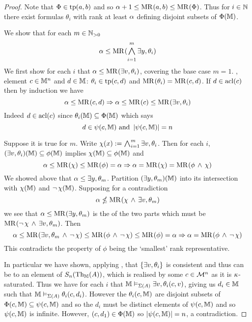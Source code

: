 \begin{proof}
    Note that $\Phi \in \operatorname{tp}(a,b)$ and so 
    $\alpha + 1 \leq \mathrm{MR}^{}(a,b) \leq \mathrm{MR}^{}(\Phi)$.
    Thus for $i \in \mathbb{N}$ there exist formulas $\theta_i$ with rank at least
    $\alpha$ defining disjoint subsets of $\Phi(\mathbb{M})$.

    We show that for each $m \in \mathbb{N}_{>0}$ 
    \[\al \leq \MR{}{\bigand{i = 1}{m} \exists y, \theta_i}\]
    We first show for each $i$ that $\alpha \leq \mathrm{MR}^{}(\exists v, \theta_i)$,
    covering the base case $m = 1$.
    ,
    element $c \in \mathbb{M}^n$ and $d \in \mathbb{M}$: $\theta_i \in \operatorname{tp}(c,d)$
    and $\mathrm{MR}^{}(\theta_i) = \mathrm{MR}^{}(c,d)$.
    If $d \in \operatorname{acl}(c)$ then by induction we have 
    \[\alpha \leq \mathrm{MR}^{}(c,d) 
    \Rightarrow \alpha \leq \mathrm{MR}^{}(c) \leq \mathrm{MR}^{}(\exists v, \theta_i)\]
    Indeed $d \in \operatorname{acl}(c)$ since 
    $\theta_i(\mathbb{M}) \subseteq \Phi(\mathbb{M})$ which says 
    \[d \in \psi(c, \mathbb{M}) \text{ and } \left\vert \psi(c,\mathbb{M}) \right\vert = n\]

    Suppose it is true for $m$.
    Write $\chi(x) := \bigand{i = 1}{m} \exists v, \theta_i$.
    Then for each $i$, $(\exists v, \theta_i)(\mathbb{M}) \subseteq \phi(\mathbb{M})$ implies 
    $\chi(\mathbb{M}) \subseteq \phi(\mathbb{M})$ and 
    \[
        \alpha \leq \mathrm{MR}^{}(\chi) \leq \mathrm{MR}^{}(\phi) = \alpha 
        \Rightarrow \alpha = \mathrm{MR}^{}(\chi) = \mathrm{MR}^{}(\phi \, \land \, \chi)
    \]
    We showed above that $\alpha \leq \exists y, \theta_m$.
    Partition $(\exists y, \theta_m)(\mathbb{M})$ into its intersection with 
    $\chi(\mathbb{M})$ and $\neg\, \chi(\mathbb{M})$.
    Supposing for a contradiction 
    \[\alpha \nleq \mathrm{MR}^{}(\chi \, \land \, \exists v, \theta_m)\]
    we see that $\alpha \leq \mathrm{MR}^{}(\exists y, \theta_m)$ is the 
     of the two parts
    which must be $\mathrm{MR}^{}(\neg\, \chi \, \land \, \exists v, \theta_m)$.
    Then 
    \[
        \alpha \leq \mathrm{MR}^{}(\exists v, \theta_m \, \land \, \neg\, \chi) 
        \leq \mathrm{MR}^{}(\phi \, \land \, \neg\, \chi) \leq \mathrm{MR}^{}(\phi) = \alpha 
        \Rightarrow \alpha = \mathrm{MR}^{}(\phi \, \land \, \neg\, \chi)
    \]
    This contradicts the property of $\phi$ being the 
    `smallest' rank representative.

    In particular we have shown, applying 
    ,
    that $\left\{\exists v, \theta_i\right\}$ is consistent and thus can be 
     to 
    an element of $S_n(\mathrm{Th}_{\mathbb{M}}(A))$, which is realised by some $c \in \mathcal{M}^n$ 
    as it is $\kappa$-saturated.
    Thus we have for each $i$ that $\mathbb{M} \vDash_{\Sigma(A)} \exists v, \theta_i(c,v)$,
    giving us $d_i \in \mathbb{M}$ such that $\mathbb{M} \vDash_{\Sigma(A)} \theta_i(c,d_i)$.
    However the $\theta_i(c,\mathbb{M})$ are disjoint subsets of 
    $\Phi(c,\mathbb{M}) \subseteq \psi(c,\mathbb{M})$ and so the $d_i$ must be
    distinct elements of $\psi(c,\mathbb{M})$ and so $\psi(c,\mathbb{M})$ is infinite.
    However, $(c,d_1) \in \Phi(\mathbb{M})$ so $\left\vert \psi(c,\mathbb{M}) \right\vert = n$, a contradiction.
\end{proof}

